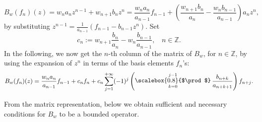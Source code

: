 \documentclass[12pt, reqno]{amsart}
\DeclareMathOperator*{\Mprod}{\text{\raisebox{0.25ex}{\scalebox{0.8}{$\prod$}}}}
\theoremstyle{definition}
\theoremstyle{remark}
\numberwithin{equation}{section}
\begin{document}
\[
B_{w}(f_{n})(z)=w_{n}a_{n}z^{n-1}+w_{n+1}b_{n}z^{n}=\frac{w_{n}a_n}{a_{n-1}}f_{{n-1}} + \left(\frac{w_{n+1}b_{n}}{a_{n}}-\frac{w_{n}b_{n-1}}{a_{n-1}}\right)a_{n} z^{n},
\]
by substituting $z^{n-1}=\frac{1}{a_{n-1}}(f_{n-1}-b_{n-1}z^{n})$. Set
\[
c_{n}:=w_{n+1}\frac{b_{n}}{a_{n}}-w_{n}\frac{b_{n-1}}{a_{n-1}},~~~~n\in \mathbb{Z}.
\]
In the following, we now get the $n$-th column of the matrix of $B_w$, for $n\in \mathbb{Z}$, by using the expansion of $z^{n}$ in terms of the basis elements $f_n$'s:
\[
B_{w}(f_{n})(z)=\frac{w_{n}a_n}{a_{n-1}}f_{{n-1}}+c_{n}f_{n}+c_{n}\sum_{j=1}^{+\infty}(-1)^{j}\left(\Mprod_{k=0}^{j-1}\frac{b_{n+k}}{a_{n+k+1}}\right)f_{n+j}.
\]
 
 
 
 From the matrix representation, below we obtain sufficient and necessary conditions for $B_w$ to be a bounded operator.
    
\end{document}
